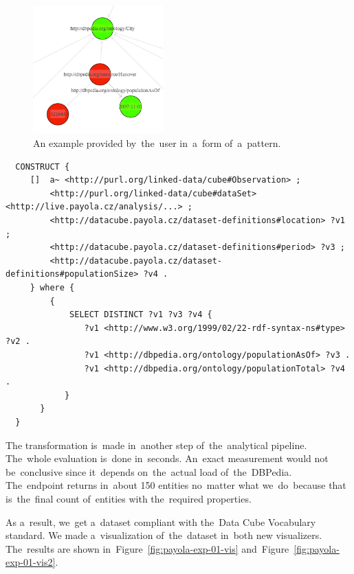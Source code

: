\begin{figure}
  \centering
  \includegraphics[width=50mm]{img/payola-exp-01-selection.png}
  \caption{An example provided by~the~user in~a~form of~a~pattern.}
  \label{fig:payola-exp-01-selection}
\end{figure}

\scriptsize
\begin{verbatim}
  CONSTRUCT {
     []  a~ <http://purl.org/linked-data/cube#Observation> ;
         <http://purl.org/linked-data/cube#dataSet> <http://live.payola.cz/analysis/...> ;
         <http://datacube.payola.cz/dataset-definitions#location> ?v1 ;
         <http://datacube.payola.cz/dataset-definitions#period> ?v3 ;
         <http://datacube.payola.cz/dataset-definitions#populationSize> ?v4 .
     } where {
         {
             SELECT DISTINCT ?v1 ?v3 ?v4 {
                ?v1 <http://www.w3.org/1999/02/22-rdf-syntax-ns#type> ?v2 .
                ?v1 <http://dbpedia.org/ontology/populationAsOf> ?v3 .
                ?v1 <http://dbpedia.org/ontology/populationTotal> ?v4 .
            }
       }
  } 
\end{verbatim}
\normalsize

\begin{sloppypar}
The transformation is~made in~another step of~the~analytical pipeline. The~whole evaluation is~done in~seconds. An~exact measurement would not be~conclusive since it~depends on~the~actual load of~the~DBPedia. The~endpoint 
returns in~about 150 entities no~matter what we~do~because that is~the~final
count of~entities with the~required properties.
\end{sloppypar}

As a~result, we~get a~dataset compliant with the~Data Cube Vocabulary standard. 
We made a~visualization of~the~dataset in~both new visualizers. The~results are 
shown in~Figure~\ref{fig:payola-exp-01-vis} and~Figure~\ref{fig:payola-exp-01-vis2}.

